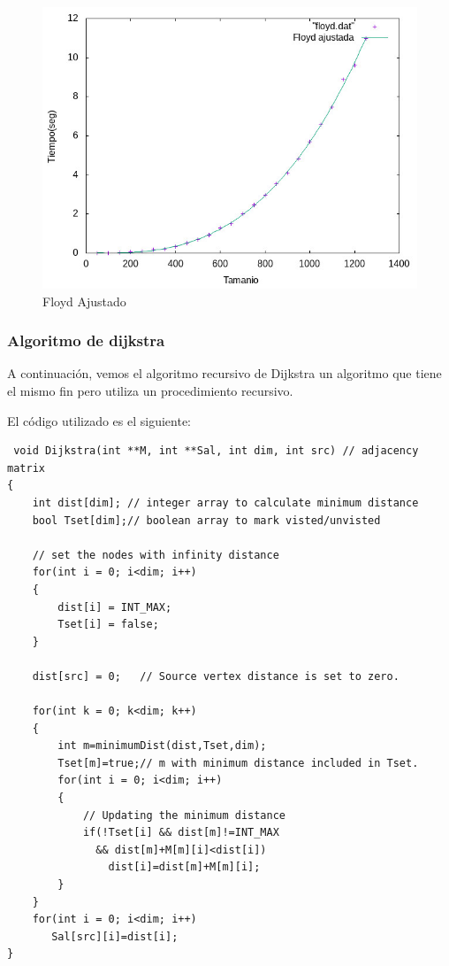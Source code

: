 \documentclass[12pt, spanish]{article}
\begin{document}
\begin{figure}[H]
  \centering
  \includegraphics[scale = 0.9]{AjusteFloyd.png}
  \caption{Floyd Ajustado}
\end{figure}

\subsubsection{Algoritmo de dijkstra}
A continuación, vemos el algoritmo recursivo de Dijkstra un algoritmo que tiene el mismo fin pero utiliza un procedimiento recursivo.

\newpage

El código utilizado es el siguiente:

\begin{verbatim}
 void Dijkstra(int **M, int **Sal, int dim, int src) // adjacency matrix
{
	int dist[dim]; // integer array to calculate minimum distance
	bool Tset[dim];// boolean array to mark visted/unvisted

	// set the nodes with infinity distance
	for(int i = 0; i<dim; i++)
	{
		dist[i] = INT_MAX;
		Tset[i] = false;
	}

	dist[src] = 0;   // Source vertex distance is set to zero.

	for(int k = 0; k<dim; k++)
	{
		int m=minimumDist(dist,Tset,dim);
		Tset[m]=true;// m with minimum distance included in Tset.
		for(int i = 0; i<dim; i++)
		{
			// Updating the minimum distance
			if(!Tset[i] && dist[m]!=INT_MAX
              && dist[m]+M[m][i]<dist[i])
				dist[i]=dist[m]+M[m][i];
		}
	}
	for(int i = 0; i<dim; i++)
	   Sal[src][i]=dist[i];
}
\end{verbatim}
\end{document}
